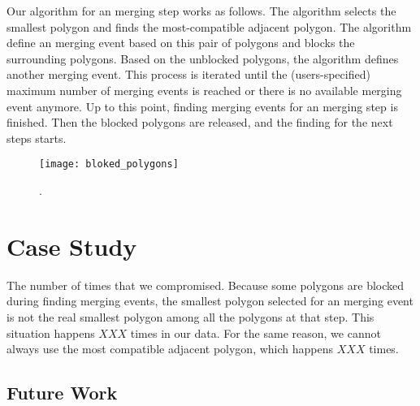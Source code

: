 \documentclass[ijgi,article,submit,moreauthors,pdftex]{Definitions/mdpi}
\begin{document}
Our algorithm for an merging step works as follows.
The algorithm selects the smallest polygon and finds the most-compatible adjacent polygon.
The algorithm define an merging event based on this pair of polygons 
and blocks the surrounding polygons.
Based on the unblocked polygons, the algorithm defines another merging event.
This process is iterated 
until the (users-specified) maximum number of merging events is reached or 
there is no available merging event anymore.
Up to this point, finding merging events for an merging step is finished.
Then the blocked polygons are released, and the finding for the next steps starts.


\begin{figure}[htb]
\centering
\texttt{[image: bloked\_polygons]}
\caption{.}
\label{fig:bloked_polygons}
\end{figure}


%
%

\section{Case Study}

The number of times that we compromised.
Because some polygons are blocked during finding merging events, 
the smallest polygon selected for an merging event 
is not the real smallest polygon 
among all the polygons at that step. 
This situation happens $XXX$ times in our data.
For the same reason, we cannot always use the most compatible adjacent polygon,
which happens $XXX$ times.


\subsection{Future Work}
\end{document}
